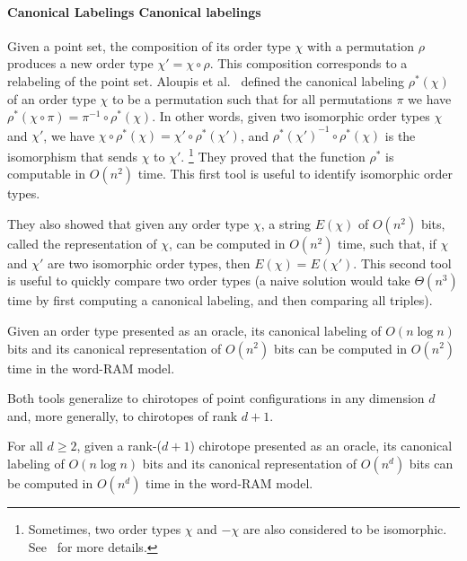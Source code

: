 
\paragraph*{\iftitlecase%
Canonical Labelings\else%
Canonical labelings\fi}
%
Given a point set, the composition of its order type \(\chi\) with a
permutation \(\rho\) produces a new order type \(\chi' = \chi \circ \rho\).
This composition corresponds to a relabeling of the point set.
%
Aloupis et al.~\cite{AILOW14} defined the canonical labeling \(\rho^*(\chi)\)
of an order type \(\chi\) to be a permutation such that for all permutations
\(\pi\) we have \(\rho^*(\chi \circ \pi) = \pi^{-1} \circ \rho^*(\chi)\).
In other words, given two isomorphic order types \(\chi\) and \(\chi'\), we
have \(\chi \circ \rho^*(\chi) = \chi' \circ \rho^*(\chi')\), and
\({\rho^*(\chi')}^{-1} \circ \rho^*(\chi)\) is the isomorphism that sends
\(\chi\) to \(\chi'\).%
\footnote{Sometimes, two order types \(\chi\) and \(- \chi\) are also considered
to be isomorphic. See~\cite{AILOW14} for more details.}
They proved that the function \(\rho^*\) is
computable in \(O(n^2)\) time.
%
This first tool is useful to identify isomorphic order types.

They also showed that given any order type \(\chi\), a string \(E(\chi)\) of
\(O(n^2)\) bits, called the representation of \(\chi\), can be computed in
\(O(n^2)\) time, such that, if \(\chi\) and \(\chi'\) are two isomorphic order
types, then \(E(\chi) = E(\chi')\).
%
This second tool is useful to quickly compare two order types (a naive solution
would take \(\Theta(n^3)\) time by first computing a canonical labeling, and
then comparing all triples).

\begin{lemma}\label{lem:canonical-labeling}
  Given an order type presented as an oracle,
  its canonical labeling of \(O(n \log n)\) bits
  and
  its canonical representation of \(O(n^2)\) bits
  can be computed in \(O(n^2)\) time
  in the word-RAM model.
\end{lemma}

Both tools generalize to chirotopes of point configurations in any dimension
\(d\) and, more generally, to chirotopes of rank \(d+1\).

\begin{lemma}\label{lem:canonical-labeling-d}
  For all \(d \geq 2\),
  given a rank-(\(d+1\)) chirotope presented as an oracle,
  its canonical labeling of \(O(n \log n)\) bits
  and
  its canonical representation of \(O(n^d)\) bits
  can be computed in \(O(n^d)\) time
  in the word-RAM model.
\end{lemma}

